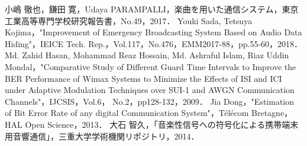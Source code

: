 \documentclass[a4j,11pt,dvipdfmx]{jsarticle}
\begin{document}
\begin{thebibliography}{99}



  小嶋 徹也，鎌田 寛，Udaya PARAMPALLI，楽曲を用いた通信システム，東京工業高等専門学校研究報告書，No.49，2017．
  Youki Sada, Tetsuya Kojima，"Improvement of Emergency Broadcasting System Based on Audio Data Hiding"，IEICE Tech. Rep.，Vol.117，No.476，EMM2017-88，pp.55-60，2018．
  Md. Zahid Hasan, Mohammad Reaz Hossain, Md. Ashraful Islam, Riaz Uddin Mondal，"Comparative Study of Different Guard Time Intervals to Improve the BER Performance of Wimax Systems to Minimize the Effects of ISI
  and ICI under Adaptive Modulation Techniques over SUI-1 and AWGN Communication Channels"，IJCSIS，Vol.6， No.2，pp128-132，2009．
  Jia Dong，"Estimation of Bit Error Rate of any digital Communication System"，Télécom Bretagne，HAL Open Science，2013．
  大石 智久，「音楽性信号への符号化による携帯端末用音響通信」，三重大学学術機関リポジトリ，2014．
\end{thebibliography}
\end{document}
